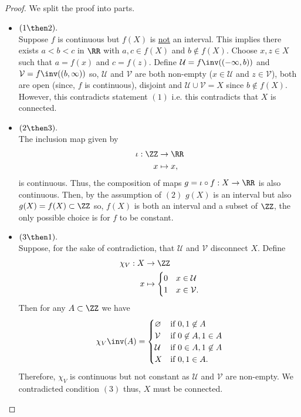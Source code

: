 \documentclass[12pt, a4paper]{article}
\begin{document}
\begin{proof}
    We split the proof into parts.
    \begin{itemize}
        \item \((1 \then 2).\) \\
        Suppose \(f\) is continuous but \(f(X)\) is \underline{not} an interval. This implies there exists \(a<b<c\) in \(\RR\) with \(a,c \in f(X)\) and \(b \not\in f(X)\). Choose \(x,z \in X\) such that \(a=f(x)\) and \(c=f(z)\). Define \(\mathcal{U}=f\inv((-\infty,b))\) and \(\mathcal{V}=f\inv((b,\infty))\) so, \(\mathcal{U}\) and \(\mathcal{V}\) are both non-empty (\(x \in \mathcal{U}\) and \(z \in \mathcal{V}\)), both are open (since, \(f\) is continuous), disjoint and \(\mathcal{U} \cup \mathcal{V} =X\) since \(b \not\in f(X)\). However, this contradicts statement \((1)\) i.e. this contradicts that \(X\) is connected.
        \item \((2\then 3).\) \\
        The inclusion map given by 
        \[\begin{aligned}
            \iota : \ZZ &\to \RR \\
            x &\mapsto x,
        \end{aligned}\]
        is continuous. Thus, the composition of maps \(g=\iota \circ f :X \to \RR\) is also continuous. Then, by the assumption of \((2)\) \(g(X)\) is an interval but also \(g(X)=f(X) \subset \ZZ\) so, \(f(X)\) is both an interval and a subset of \(\ZZ\), the only possible choice is for \(f\) to be constant.
        \item \((3 \then 1).\) \\
        Suppose, for the sake of contradiction, that \(\mathcal{U}\) and \(\mathcal{V}\) disconnect \(X\). Define 
        \[\begin{aligned}
            \chi_V : X &\to \ZZ \\
            x &\mapsto \begin{cases}
                0 &x \in \mathcal{U} \\
                1 &x \in \mathcal{V}.
            \end{cases}
        \end{aligned}\]
        Then for any \(A \subset \ZZ\) we have 
        \[\begin{aligned}
            \chi_V\inv(A) = \begin{cases}
                \varnothing &\text{if } 0,1 \not\in A \\
                \mathcal{V} &\text{if } 0 \not\in A, 1 \in A \\
                \mathcal{U} &\text{if } 0 \in A, 1\not\in A \\
                X &\text{if } 0,1 \in A.
            \end{cases}
        \end{aligned}\]
        Therefore, \(\chi_V\) is continuous but not constant as \(\mathcal{U}\) and \(\mathcal{V}\) are non-empty. We contradicted condition \((3)\) thus, \(X\) must be connected.
    \end{itemize}
\end{proof}
\end{document}
